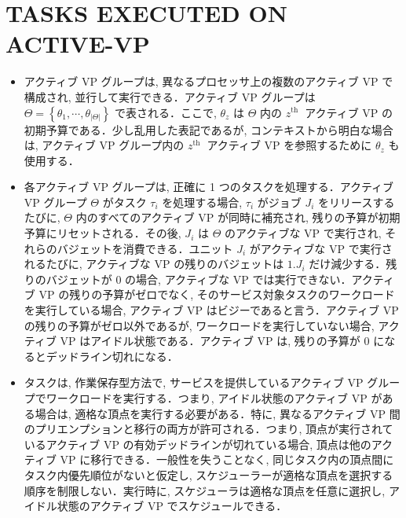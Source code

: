 
\section{TASKS EXECUTED ON ACTIVE-VP}
\label{sec: tasks executed on active-vp}

\begin{frame}{}
    \begin{itemize}
        \item アクティブ VP グループは, 異なるプロセッサ上の複数のアクティブ VP で構成され, 並行して実行できる．アクティブ VP グループは $\Theta=\left\{\theta_{1}, \cdots, \theta_{|\Theta|}\right\}$ で表される．ここで, $\theta_{z}$ は $\Theta$ 内の $z^{\text {th }}$ アクティブ VP の初期予算である．少し乱用した表記であるが, コンテキストから明白な場合は, アクティブ VP グループ内の $z^{\text {th }}$ アクティブ VP を参照するために $\theta_{z}$ も使用する．
    \end{itemize}
\end{frame}

\begin{frame}{}
    \begin{itemize}
        \item 各アクティブ VP グループは, 正確に 1 つのタスクを処理する．アクティブ VP グループ $\Theta$ がタスク $\tau_{i}$ を処理する場合, $\tau_{i}$ がジョブ $J_{i}$ をリリースするたびに, $\Theta$ 内のすべてのアクティブ VP が同時に補充され, 残りの予算が初期予算にリセットされる．その後, $J_{i}$ は $\Theta$ のアクティブな VP で実行され, それらのバジェットを消費できる．ユニット $J_{i}$ がアクティブな $\mathrm{VP}$ で実行されるたびに, アクティブな VP の残りのバジェットは $1 . J_{i}$ だけ減少する．残りのバジェットが 0 の場合, アクティブな VP では実行できない．アクティブ VP の残りの予算がゼロでなく, そのサービス対象タスクのワークロードを実行している場合, アクティブ VP はビジーであると言う．アクティブ VP の残りの予算がゼロ以外であるが, ワークロードを実行していない場合, アクティブ VP はアイドル状態である．アクティブ VP は, 残りの予算が 0 になるとデッドライン切れになる．
    \end{itemize}
\end{frame}

\begin{frame}{}
    \begin{itemize}
        \item タスクは, 作業保存型方法で, サービスを提供しているアクティブ VP グループでワークロードを実行する．つまり, アイドル状態のアクティブ VP がある場合は, 適格な頂点を実行する必要がある．特に, 異なるアクティブ VP 間のプリエンプションと移行の両方が許可される．つまり, 頂点が実行されているアクティブ VP の有効デッドラインが切れている場合, 頂点は他のアクティブ VP に移行できる．一般性を失うことなく, 同じタスク内の頂点間にタスク内優先順位がないと仮定し, スケジューラーが適格な頂点を選択する順序を制限しない．実行時に, スケジューラは適格な頂点を任意に選択し, アイドル状態のアクティブ VP でスケジュールできる．
    \end{itemize}
\end{frame}

